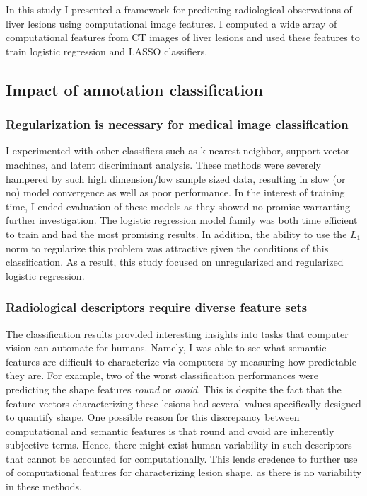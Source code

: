 In this study I presented a framework for predicting radiological observations of liver lesions using computational image features. I computed a wide array of computational features from CT images of liver lesions and used these features to train logistic regression and LASSO classifiers.

\subsection{Impact of annotation classification}
\subsubsection{Regularization is necessary for medical image classification}
I experimented with other classifiers such as k-nearest-neighbor, support vector machines, and latent discriminant analysis. These methods were severely hampered by such high dimension/low sample sized data, resulting in slow (or no) model convergence as well as poor performance. In the interest of training time, I ended evaluation of these models as they showed no promise warranting further investigation. The logistic regression model family was both time efficient to train and had the most promising results. In addition, the ability to use the $L_1$ norm to regularize this problem was attractive given the conditions of this classification. As a result, this study focused on unregularized and regularized logistic regression. 

\subsubsection{Radiological descriptors require diverse feature sets}
The classification results provided interesting insights into tasks that computer vision can automate for humans. Namely, I was able to see what semantic features are difficult to characterize via computers by measuring how predictable they are. For example, two of the worst classification performances were predicting the shape features \emph{round} or \emph{ovoid}. This is despite the fact that the feature vectors characterizing these lesions had several values specifically designed to quantify shape. One possible reason for this discrepancy between computational and semantic features is that round and ovoid are inherently subjective terms. Hence, there might exist human variability in such descriptors that cannot be accounted for computationally. This lends credence to further use of computational features for characterizing lesion shape, as there is no variability in these methods. 

